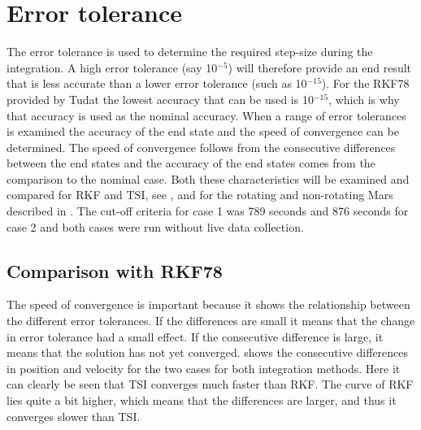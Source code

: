 \section{Error tolerance}
\label{sec:errorTolerance}
The error tolerance is used to determine the required step-size during the integration. A high error tolerance (say 10$^{-5}$) will therefore provide an end result that is less accurate than a lower error tolerance (such as 10$^{-15}$). For the \ac{RKF78} provided by \ac{Tudat} the lowest accuracy that can be used is 10$^{-15}$, which is why that accuracy is used as the nominal accuracy. When a range of error tolerances is examined the accuracy of the end state and the speed of convergence can be determined. The speed of convergence follows from the consecutive differences between the end states and the accuracy of the end states comes from the comparison to the nominal case. Both these characteristics will be examined and compared for \ac{RKF} and \ac{TSI}, see , and for the rotating and non-rotating Mars described in . The cut-off criteria for case 1 was 789 seconds and 876 seconds for case 2 and both cases were run without live data collection.




\subsection{Comparison with \ac{RKF78}}
\label{subsec:errorToleranceCompRKF}
The speed of convergence is important because it shows the relationship between the different error tolerances. If the differences are small it means that the change in error tolerance had a small effect. If the consecutive difference is large, it means that the solution has not yet converged.  shows the consecutive differences in position and velocity for the two cases for both integration methods. Here it can clearly be seen that \ac{TSI} converges much faster than \ac{RKF}. The curve of \ac{RKF} lies quite a bit higher, which means that the differences are larger, and thus it converges slower than \ac{TSI}.




%

